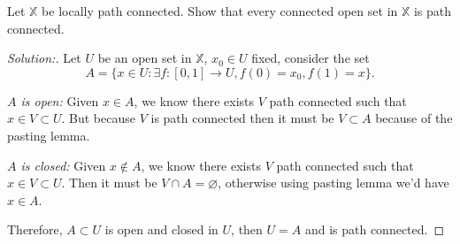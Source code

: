 \documentclass[a4paper,12pt, reqno]{article}
\theoremstyle{definition}
\newenvironment{exerr}[1]{
  \renewcommand\theexeralt{#1}
  \exeralt
}{\endexeralt}
\newenvironment{solution}{\begin{proof}[Solution:]}{\end{proof}}
\newcommand{\X}{\mathbb{X}}
\begin{document}
\begin{exerr}{4}
  Let $\X$ be locally path connected. Show that every connected open set in $\X$ is path connected.
\end{exerr}
\begin{solution}
  Let $U$ be an open set in $\X$, $x_{0}\in U$ fixed, consider the set
  \begin{equation*}
      A = \{ x\in U : \exists f:[0,1]\to U, f(0)=x_{0},f(1)=x \}.
  \end{equation*}
  
  \textit{$A$ is open:} Given $x\in A$, we know there exists $V$ path connected such that $x\in V\subset U$. But because $V$ is path connected then it must be $V\subset A$ because of the pasting lemma.

  \textit{$A$ is closed:} Given $x\notin A$, we know there exists $V$ path connected such that $x\in V\subset U$. Then it must be $V\cap A = \varnothing$, otherwise using pasting lemma we'd have $x\in A$.
  
  Therefore, $A\subset U$ is open and closed in $U$, then $U=A$ and is path connected.
\end{solution}
\end{document}

